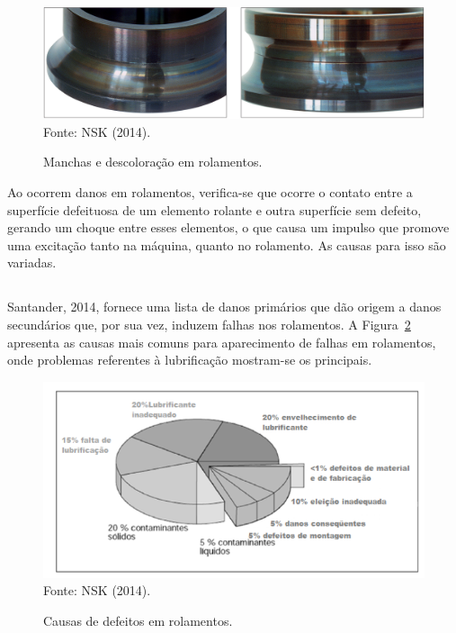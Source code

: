 \documentclass[
	12pt,				
	oneside,			
	a4paper,			
	english,			
	brazil,			
	]{abntex2ppgsi}
\begin{document}
\begin{figure}[H]
\centering
\caption {Manchas e descoloração em rolamentos.}
\includegraphics[width=\textwidth,height=\textheight,keepaspectratio]{manchas_nsk} \\
Fonte: NSK (2014).
\label{manchas_nsk}
\end{figure}

Ao ocorrem danos em rolamentos, verifica-se que ocorre o contato entre a superfície defeituosa de um elemento rolante e outra superfície sem defeito, gerando um choque entre esses elementos, o que causa um impulso que promove uma excitação tanto na máquina, quanto no rolamento. As causas para isso são variadas.

\subsection{}

Santander, 2014, fornece uma lista de danos primários que dão origem a danos secundários que, por sua vez, induzem falhas nos rolamentos. A Figura~\ref{falhas_comuns_rolamentos} apresenta as causas mais comuns para aparecimento de falhas em rolamentos, onde problemas referentes à lubrificação mostram-se os principais.

\begin{figure}[H]
\centering
\caption {Causas de defeitos em rolamentos.}
\includegraphics[width=\textwidth,height=\textheight,keepaspectratio]{falhas_comuns_rolamentos} \\
Fonte: NSK (2014).
\label{falhas_comuns_rolamentos}
\end{figure}
\end{document}
